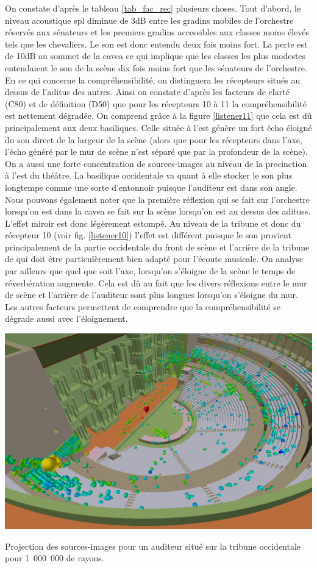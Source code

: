  
On constate d'après le tableau \ref{tab_fac_rec} plusieurs choses. Tout d'abord, le niveau acoustique \gls{spl} diminue de 3dB entre les gradins mobiles de l'orchestre réservés aux sénateurs et les premiers gradins accessibles aux classes moins élevés tels que les chevaliers. Le son est donc entendu deux fois moins fort. La perte est de 10dB au sommet de la cavea ce qui implique que les classes les plus modestes entendaient le son de la scène dix fois moins fort que les sénateurs de l'orchestre. En ce qui concerne la compréhensibilité, on distinguera les récepteurs situés au dessus de l'\gls{aditus} des autres. Ainsi on constate d'après les facteurs de clarté (\gls{C80}) et de définition (\gls{D50}) que pour les récepteurs 10 à 11 la compréhensibilité est nettement dégradée. On comprend grâce à la figure \ref{listener11} que cela est dû principalement aux deux \glspl{basilique}. Celle située à l'est génère un fort écho éloigné du son direct de la largeur de la scène (alors que pour les récepteurs dans l'axe, l'écho généré par le mur de scène n'est séparé que par la profondeur de la scène). On a aussi une forte concentration de sources-images au niveau de la \gls{precinction} à l'est du théâtre. La basilique occidentale va quant à elle stocker le son plus longtemps comme une sorte d'entonnoir puisque l'auditeur est dans son angle. Nous pouvons également noter que la première réflexion qui se fait sur l'orchestre lorsqu'on est dans la \gls{cavea} se fait sur la scène lorsqu'on est au dessus des \glspl{aditus}. L'effet miroir est donc légèrement estompé. Au niveau de la tribune et donc du récepteur 10 (voir fig. \ref{listener10}) l'effet est différent puisque le son provient principalement de la partie occidentale du front de scène et l'arrière de la tribune de qui doit être particulèrement bien adapté pour l'écoute musicale.
On analyse par ailleurs que quel que soit l'axe, lorsqu'on s'éloigne de la scène le temps de réverbération augmente. Cela est dû au fait que les divers réflexions entre le mur de scène et l'arrière de l'auditeur sont plus longues lorsqu'on s'éloigne du mur. Les autres facteurs permettent de comprendre que la compréhensibilité se dégrade aussi avec l'éloignement. 
%
\begin{figureth}
	\includegraphics[width=\linewidth]{images/Listener11}
	\caption{Projection des sources-images pour un auditeur situé sur la tribune occidentale pour 1~000~000 de rayons.}
	\label{listener10}
\end{figureth}

